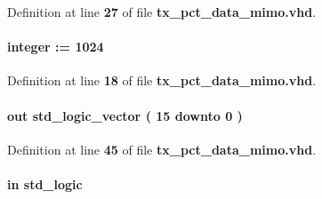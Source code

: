 Definition at line {\bf 27} of file {\bf tx\+\_\+pct\+\_\+data\+\_\+mimo.\+vhd}.

\paragraph[{pct\+\_\+size}]{ {\bfseries \textcolor{vhdlchar}{ }} {\bfseries \textcolor{comment}{integer}\textcolor{vhdlchar}{ }\textcolor{vhdlchar}{ }\textcolor{vhdlchar}{\+:}\textcolor{vhdlchar}{=}\textcolor{vhdlchar}{ }\textcolor{vhdlchar}{ } \textcolor{vhdldigit}{1024} \textcolor{vhdlchar}{ }} \hspace{0.3cm}{\ttfamily [Generic]}}\label{classtx__pct__data__mimo_ae10171d47fdfdffafa24d63137c0b021}


Definition at line {\bf 18} of file {\bf tx\+\_\+pct\+\_\+data\+\_\+mimo.\+vhd}.

\paragraph[{rd\+\_\+cnt\+\_\+ext}]{ {\bfseries \textcolor{keywordflow}{out}\textcolor{vhdlchar}{ }} {\bfseries \textcolor{comment}{std\+\_\+logic\+\_\+vector}\textcolor{vhdlchar}{ }\textcolor{vhdlchar}{(}\textcolor{vhdlchar}{ }\textcolor{vhdlchar}{ } \textcolor{vhdldigit}{15} \textcolor{vhdlchar}{ }\textcolor{keywordflow}{downto}\textcolor{vhdlchar}{ }\textcolor{vhdlchar}{ } \textcolor{vhdldigit}{0} \textcolor{vhdlchar}{ }\textcolor{vhdlchar}{)}\textcolor{vhdlchar}{ }} \hspace{0.3cm}{\ttfamily [Port]}}\label{classtx__pct__data__mimo_a67ebe6266ba063e0ad33645d40d0f59d}


Definition at line {\bf 45} of file {\bf tx\+\_\+pct\+\_\+data\+\_\+mimo.\+vhd}.

\paragraph[{reset\+\_\+n}]{ {\bfseries \textcolor{keywordflow}{in}\textcolor{vhdlchar}{ }} {\bfseries \textcolor{comment}{std\+\_\+logic}\textcolor{vhdlchar}{ }} \hspace{0.3cm}{\ttfamily [Port]}}\label{classtx__pct__data__mimo_a446ea52ed8c4a84181a47d9165ce41a5}


